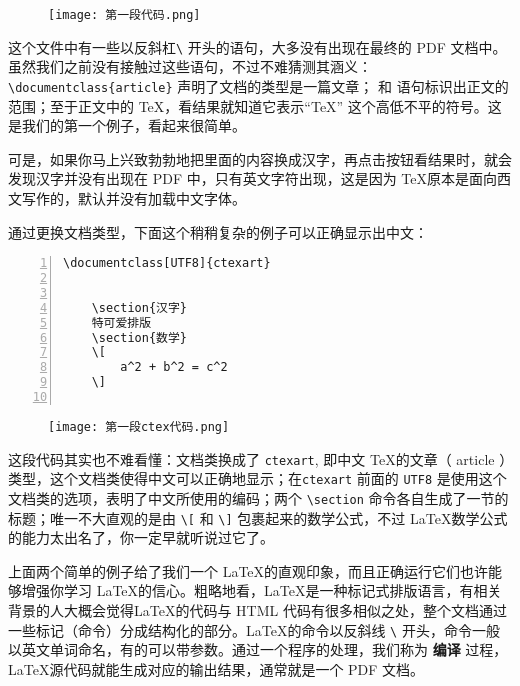 \begin{figure}[H]
    \centering
    \texttt{[image: 第一段代码.png]}
\end{figure}

这个文件中有一些以反斜杠\verb|\| 开头的语句，大多没有出现在最终的 PDF 文档中。虽然我们之前没有接触过这些语句，不过不难猜测其涵义：\verb|\documentclass{article}| 声明了文档的类型是一篇文章；\verb|| 和 \verb|| 语句标识出正文的范围；至于正文中的 \TeX ，看结果就知道它表示“\TeX” 这个高低不平的符号。这是我们的第一个例子，看起来很简单。

可是，如果你马上兴致勃勃地把里面的内容换成汉字，再点击按钮看结果时，就会发现汉字并没有出现在 PDF 中，只有英文字符出现，这是因为 \TeX 原本是面向西文写作的，默认并没有加载中文字体。

通过更换文档类型，下面这个稍稍复杂的例子可以正确显示出中文：
\begin{lstlisting}[numbers=left]
    \documentclass[UTF8]{ctexart}

    
    \section{汉字}
    特可爱排版
    \section{数学}
    \[
        a^2 + b^2 = c^2
    \]
    
\end{lstlisting}


\begin{figure}[H]
    \centering
    \texttt{[image: 第一段ctex代码.png]}
\end{figure}

这段代码其实也不难看懂：文档类换成了 \verb|ctexart|, 即中文 \TeX 的文章（ article ）类型，这个文档类使得中文可以正确地显示；在\verb|ctexart| 前面的 \verb|UTF8| 是使用这个文档类的选项，表明了中文所使用的编码；两个 \verb|\section| 命令各自生成了一节的标题；唯一不大直观的是由 \verb|\[| 和 \verb|\]| 包裹起来的数学公式，不过 \LaTeX 数学公式的能力太出名了，你一定早就听说过它了。

上面两个简单的例子给了我们一个 \LaTeX 的直观印象，而且正确运行它们也许能够增强你学习 \LaTeX 的信心。粗略地看，\LaTeX 是一种标记式排版语言，有相关背景的人大概会觉得\LaTeX 的代码与 HTML 代码有很多相似之处，整个文档通过一些标记（命令）分成结构化的部分。\LaTeX 的命令以反斜线 \verb|\| 开头，命令一般以英文单词命名，有的可以带参数。通过一个程序的处理，我们称为 \textbf{编译} 过程， \LaTeX 源代码就能生成对应的输出结果，通常就是一个 PDF 文档。


